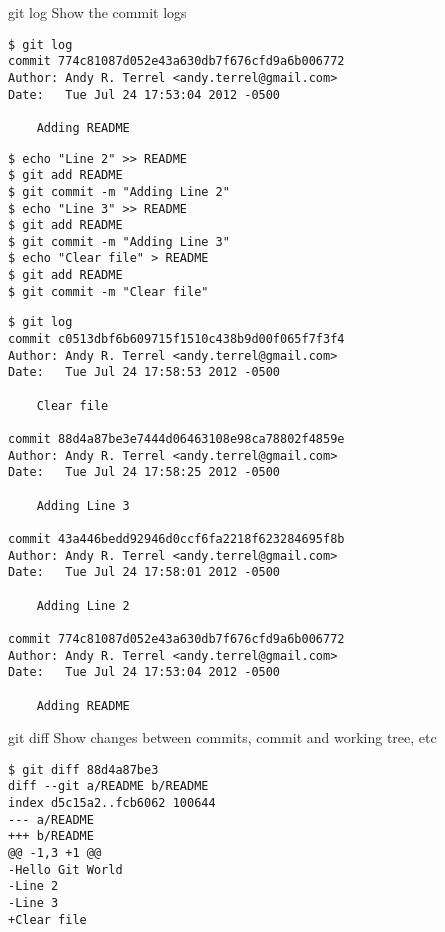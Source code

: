 \begin{frame}[fragile]
\begin{block}{git log}
Show the commit logs
\end{block}
\begin{verbatim}
$ git log
commit 774c81087d052e43a630db7f676cfd9a6b006772
Author: Andy R. Terrel <andy.terrel@gmail.com>
Date:   Tue Jul 24 17:53:04 2012 -0500

    Adding README
\end{verbatim}
\end{frame}

\begin{frame}[fragile]
\begin{verbatim}
$ echo "Line 2" >> README
$ git add README
$ git commit -m "Adding Line 2"
$ echo "Line 3" >> README
$ git add README
$ git commit -m "Adding Line 3"
$ echo "Clear file" > README
$ git add README
$ git commit -m "Clear file"
\end{verbatim}
\end{frame}

\begin{frame}[fragile]
\tiny
\begin{verbatim}
$ git log
commit c0513dbf6b609715f1510c438b9d00f065f7f3f4
Author: Andy R. Terrel <andy.terrel@gmail.com>
Date:   Tue Jul 24 17:58:53 2012 -0500

    Clear file

commit 88d4a87be3e7444d06463108e98ca78802f4859e
Author: Andy R. Terrel <andy.terrel@gmail.com>
Date:   Tue Jul 24 17:58:25 2012 -0500

    Adding Line 3

commit 43a446bedd92946d0ccf6fa2218f623284695f8b
Author: Andy R. Terrel <andy.terrel@gmail.com>
Date:   Tue Jul 24 17:58:01 2012 -0500

    Adding Line 2

commit 774c81087d052e43a630db7f676cfd9a6b006772
Author: Andy R. Terrel <andy.terrel@gmail.com>
Date:   Tue Jul 24 17:53:04 2012 -0500

    Adding README
\end{verbatim}
\end{frame}

\begin{frame}[fragile]
\begin{block}{git diff}
Show changes between commits, commit and working tree, etc
\end{block}
\begin{verbatim}
$ git diff 88d4a87be3
diff --git a/README b/README
index d5c15a2..fcb6062 100644
--- a/README
+++ b/README
@@ -1,3 +1 @@
-Hello Git World
-Line 2
-Line 3
+Clear file
\end{verbatim}
\end{frame}

